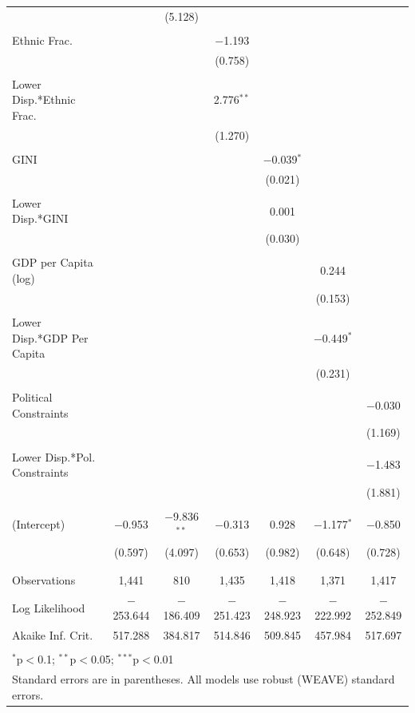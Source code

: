 \documentclass[a4paper]{article}\usepackage[]{graphicx}\usepackage[]{color}
\begin{document}
\begin{table}[H]
\begin{center}
{\begin{tabular}{@{\extracolsep{5pt}}lcccccc}
  &  & (5.128) &  &  &  &  \\ 
  & & & & & & \\ 
 Ethnic Frac. &  &  & $-$1.193 &  &  &  \\ 
  &  &  & (0.758) &  &  &  \\ 
  & & & & & & \\ 
 Lower Disp.*Ethnic Frac. &  &  & 2.776$^{**}$ &  &  &  \\ 
  &  &  & (1.270) &  &  &  \\ 
  & & & & & & \\ 
 GINI &  &  &  & $-$0.039$^{*}$ &  &  \\ 
  &  &  &  & (0.021) &  &  \\ 
  & & & & & & \\ 
 Lower Disp.*GINI &  &  &  & 0.001 &  &  \\ 
  &  &  &  & (0.030) &  &  \\ 
  & & & & & & \\ 
 GDP per Capita (log) &  &  &  &  & 0.244 &  \\ 
  &  &  &  &  & (0.153) &  \\ 
  & & & & & & \\ 
 Lower Disp.*GDP Per Capita &  &  &  &  & $-$0.449$^{*}$ &  \\ 
  &  &  &  &  & (0.231) &  \\ 
  & & & & & & \\ 
 Political Constraints &  &  &  &  &  & $-$0.030 \\ 
  &  &  &  &  &  & (1.169) \\ 
  & & & & & & \\ 
 Lower Disp.*Pol. Constraints &  &  &  &  &  & $-$1.483 \\ 
  &  &  &  &  &  & (1.881) \\ 
  & & & & & & \\ 
 (Intercept) & $-$0.953 & $-$9.836$^{**}$ & $-$0.313 & 0.928 & $-$1.177$^{*}$ & $-$0.850 \\ 
  & (0.597) & (4.097) & (0.653) & (0.982) & (0.648) & (0.728) \\ 
  & & & & & & \\ 
\hline \\[-1.8ex] 
Observations & 1,441 & 810 & 1,435 & 1,418 & 1,371 & 1,417 \\ 
Log Likelihood & $-$253.644 & $-$186.409 & $-$251.423 & $-$248.923 & $-$222.992 & $-$252.849 \\ 
Akaike Inf. Crit. & 517.288 & 384.817 & 514.846 & 509.845 & 457.984 & 517.697 \\ 
\hline 
\hline \\[-1.8ex] 
\multicolumn{7}{l}{$^{*}$p$<$0.1; $^{**}$p$<$0.05; $^{***}$p$<$0.01} \\ 
\multicolumn{7}{l}{Standard errors are in parentheses. All models use robust (WEAVE) standard errors.} \\ 
\end{tabular} 

    }
    \end{center}
\end{table}
\end{document}
